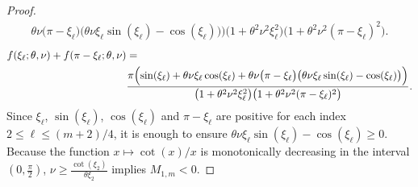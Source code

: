 \documentclass[a4paper]{article}
\newcommand{\Mod}[1]{\ (\mathrm{mod}\ #1)}
\begin{document}
\begin{description}[style=unboxed,leftmargin=0cm]
\begin{proof}
\begin{align*}
{				\theta\nu\bigl(\pi-\xi_\ell\bigr)\bigl(\theta\nu\xi_\ell\sin(\xi_\ell)-\cos(\xi_\ell)\bigr)\Bigr)}
					{\bigl(1+\theta^2\nu^2\xi^2_\ell\bigr)\bigl(1+\theta^2\nu^2(\pi-\xi_\ell)^2\bigr)}.
		\end{align*}
	\else
		\begin{align*}
			f(\xi_\ell; \theta, \nu) + f(\pi-\xi_\ell; \theta, \nu) &= \\
				&\frac{\pi\Bigl(\sin(\xi_\ell) + \theta\nu\xi_\ell\cos(\xi_\ell) +
				\theta\nu\bigl(\pi-\xi_\ell\bigr)\bigl(\theta\nu\xi_\ell\sin(\xi_\ell)-\cos(\xi_\ell)\bigr)\Bigr)}
					{\bigl(1+\theta^2\nu^2\xi^2_\ell\bigr)\bigl(1+\theta^2\nu^2(\pi-\xi_\ell)^2\bigr)}.
		\end{align*}
	\fi
	Since $\xi_\ell$, $\sin(\xi_\ell)$, $\cos(\xi_\ell)$ and $\pi-\xi_\ell$ are positive for each index $2 \le \ell \le (m+2)/4$,
	it is enough to ensure $\theta\nu\xi_\ell\sin(\xi_\ell)-\cos(\xi_\ell) \ge 0$.
	Because the function $x\mapsto\cot(x)/x$ is monotonically decreasing in the interval $(0,\frac{\pi}{2})$, 
	$\nu \ge \frac{\cot(\xi_2)}{\theta \xi_2}$ implies $M_{1,m}<0$.

\end{proof}
\end{description}
\end{document}
